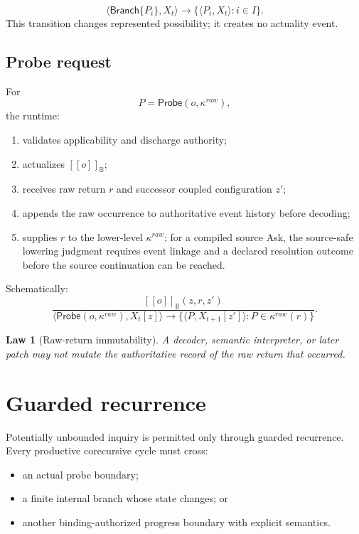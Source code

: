 \documentclass[11pt,oneside]{article}
\newtheorem{law}[definition]{Law}
\newcommand{\B}{\mathbb B}
\newcommand{\den}[1]{[\![#1]\!]}
\begin{document}
\[
\langle\mathsf{Branch}\{P_i\},X_t\rangle
\longrightarrow
\{\langle P_i,X_t\rangle:i\in I\}.
\]
This transition changes represented possibility; it creates no actuality event.

\subsection{Probe request}

For
\[
P=\mathsf{Probe}(o,\kappa^{raw}),
\]
the runtime:
\begin{enumerate}
\item validates applicability and discharge authority;
\item actualizes \(\den{o}_{\B}\);
\item receives raw return \(r\) and successor coupled configuration \(z'\);
\item appends the raw occurrence to authoritative event history before decoding;
\item supplies \(r\) to the lower-level \(\kappa^{raw}\); for a compiled source Ask, the
      source-safe lowering judgment requires event linkage and a declared resolution outcome
      before the source continuation can be reached.
\end{enumerate}

Schematically:
\[
\frac{
\den{o}_{\B}(z,r,z')
}{
\langle\mathsf{Probe}(o,\kappa^{raw}),X_t[z]\rangle
\longrightarrow
\{
\langle P,X_{t+1}[z']\rangle:
P\in\kappa^{raw}(r)
\}
}.
\]

\begin{law}[Raw-return immutability]
A decoder, semantic interpreter, or later patch may not mutate the authoritative record of the raw return that occurred.
\end{law}

\section{Guarded recurrence}

Potentially unbounded inquiry is permitted only through guarded recurrence.  Every productive corecursive cycle must cross:
\begin{itemize}
\item an actual probe boundary;
\item a finite internal branch whose state changes; or
\item another binding-authorized progress boundary with explicit semantics.
\end{itemize}
\end{document}
